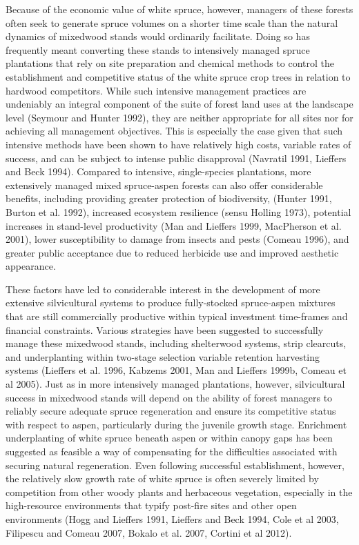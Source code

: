 \documentclass{article}\usepackage[]{graphicx}\usepackage[]{color}
\begin{document}
\begin{multicols}{2}
Because of the economic value of white spruce, however, managers of these forests often seek to generate spruce volumes on a shorter time scale than the natural dynamics of mixedwood stands would ordinarily facilitate. Doing so has frequently meant converting these stands to intensively managed spruce plantations that rely on site preparation and chemical methods to control the establishment and competitive status of the white spruce crop trees in relation to hardwood competitors. While such intensive management practices are undeniably an integral component of the suite of forest land uses at the landscape level (Seymour and Hunter 1992), they are neither appropriate for all sites nor for achieving all management objectives. This is especially the case given that such intensive methods have been shown to have relatively high costs, variable rates of success, and can be subject to intense public disapproval (Navratil 1991, Lieffers and Beck 1994). Compared to intensive, single-species plantations, more extensively managed mixed spruce-aspen forests can also offer considerable benefits, including providing greater protection of biodiversity, (Hunter 1991, Burton et al. 1992), increased ecosystem resilience (sensu Holling 1973), potential increases in stand-level productivity (Man and Lieffers 1999, MacPherson et al. 2001), lower susceptibility to damage from insects and pests (Comeau 1996), and greater public acceptance due to reduced herbicide use and improved aesthetic appearance. 

These factors have led to considerable interest in the development of more extensive silvicultural systems to produce fully-stocked spruce-aspen mixtures that are still commercially productive within typical investment time-frames and financial constraints. Various strategies have been suggested to successfully manage these mixedwood stands, including shelterwood systems, strip clearcuts, and underplanting within two-stage selection variable retention harvesting systems (Lieffers et al. 1996, Kabzems 2001, Man and Lieffers 1999b, Comeau et al 2005). Just as in more intensively managed plantations, however, silvicultural success in mixedwood stands will depend on the ability of forest managers to reliably secure adequate spruce regeneration and ensure its competitive status with respect to aspen, particularly during the juvenile growth stage. Enrichment underplanting of white spruce beneath aspen or within canopy gaps has been suggested as feasible a way of compensating for the difficulties associated with securing natural regeneration. Even following successful establishment, however, the relatively slow growth rate of white spruce is often severely limited by competition from other woody plants and herbaceous vegetation, especially in the high-resource environments that typify post-fire sites and other open environments (Hogg and Lieffers 1991, Lieffers and Beck 1994, Cole et al 2003, Filipescu and Comeau 2007, Bokalo et al. 2007, Cortini et al 2012). 


\end{multicols}
\end{document}

